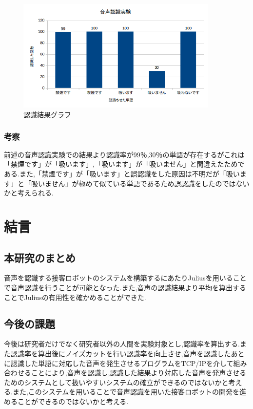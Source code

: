 \documentclass[12pt,oneside]{sotsuken_paper}
\begin{document}
\begin{figure}[htbp]
\begin{center}
\includegraphics[width=100mm]{img/result.png}
\caption{認識結果グラフ}
\label{fig:result}
\end{center}
\end{figure}


\subsection{考察}
前述の音声認識実験での結果より認識率が99％,30％の単語が存在するがこれは「禁煙です」が「吸います」,「吸います」が「吸いません」と間違えたためである.また,「禁煙です」が「吸います」と誤認識をした原因は不明だが「吸います」と「吸いません」が極めて似ている単語であるため誤認識をしたのではないかと考えられる.



\chapter{結言}
\section{本研究のまとめ}
音声を認識する接客ロボットのシステムを構築するにあたりJuliusを用いることで音声認識を行うことが可能となった.また,音声の認識結果より平均を算出することでJuliusの有用性を確かめることができた.

\section{今後の課題}
今後は研究者だけでなく研究者以外の人間を実験対象とし,認識率を算出する.また認識率を算出後にノイズカットを行い認識率を向上させ,音声を認識したあとに認識した単語に対応した音声を発生させるプログラムをTCP/IPを介して組み合わせることにより,音声を認識し,認識した結果より対応した音声を発声させるためのシステムとして扱いやすいシステムの確立ができるのではないかと考える.また,このシステムを用いることで音声認識を用いた接客ロボットの開発を進めることができるのではないかと考える.
\end{document}
